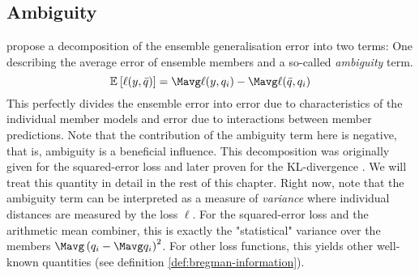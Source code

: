 \documentclass[../main.tex]{subfiles}
\begin{document}
\subsection{Ambiguity}

\citeauthor{krogh_NeuralNetworkEnsembles_1995} \cite{krogh_NeuralNetworkEnsembles_1995} propose a decomposition of the ensemble generalisation error into two terms: One describing the average error of ensemble members and a so-called \textit{ambiguity} term. 
$$
\mathbb{E}_{}\left[ \ell(y, \bar{q}) \right] = \Mavg \ell(y, q_{i}) - \Mavg \ell(\bar{q}, q_{i})
$$
This perfectly divides the ensemble error into error due to characteristics of the individual member models and error due to interactions between member predictions. Note that the contribution of the ambiguity term here is negative, that is, ambiguity is a beneficial influence. 
This decomposition was originally given for the squared-error loss \cite{krogh_NeuralNetworkEnsembles_1995} and later proven for the KL-divergence \cite{webb_EnsembleNotEnsemble_2019}.
 We will treat this quantity in detail in the rest of this chapter. Right now, note that the ambiguity term can be interpreted as a measure of \textit{variance} where individual distances are measured by the loss $\ell$. For the squared-error loss and the arithmetic mean combiner, this is exactly the "statistical" variance over the members $\Mavg \left(q_{i} - \Mavg q_{i}\right)^2$. For other loss functions, this yields other well-known quantities (see definition \ref{def:bregman-information}).
\end{document}
